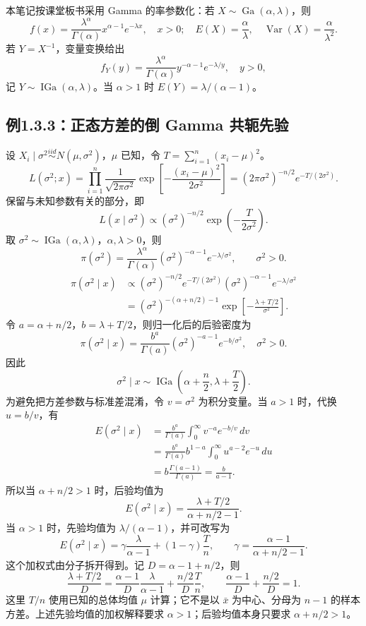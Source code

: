 本笔记按课堂板书采用 Gamma 的率参数化：若 $X\sim\operatorname{Ga}(\alpha,\lambda)$，则
\[
f(x)=\frac{\lambda^\alpha}{\Gamma(\alpha)}x^{\alpha-1}e^{-\lambda x},\quad x>0;
\quad E(X)=\frac\alpha\lambda,\quad \operatorname{Var}(X)=\frac\alpha{\lambda^2}.
\]
若 $Y=X^{-1}$，变量变换给出
\[
f_Y(y)=\frac{\lambda^\alpha}{\Gamma(\alpha)}y^{-\alpha-1}e^{-\lambda/y},\quad y>0,
\]
记 $Y\sim\operatorname{IGa}(\alpha,\lambda)$。当 $\alpha>1$ 时 $E(Y)=\lambda/(\alpha-1)$。

\subsection{例1.3.3：正态方差的倒 Gamma 共轭先验}
设 $X_i\mid\sigma^2\overset{iid}{\sim}N(\mu,\sigma^2)$，$\mu$ 已知，令 $T=\sum_{i=1}^n(x_i-\mu)^2$。
\[
L(\sigma^2;x)=\prod_{i=1}^n\frac1{\sqrt{2\pi\sigma^2}}
\exp\left[-\frac{(x_i-\mu)^2}{2\sigma^2}\right]
=(2\pi\sigma^2)^{-n/2}e^{-T/(2\sigma^2)}.
\]
保留与未知参数有关的部分，即
\[
L(x\mid\sigma^2)\propto(\sigma^2)^{-n/2}\exp\left(-\frac{T}{2\sigma^2}\right).
\]
取 $\sigma^2\sim\operatorname{IGa}(\alpha,\lambda)$，$\alpha,\lambda>0$，则
\[
\pi(\sigma^2)=\frac{\lambda^\alpha}{\Gamma(\alpha)}
(\sigma^2)^{-\alpha-1}e^{-\lambda/\sigma^2},\qquad\sigma^2>0.
\]
\begin{align*}
\pi(\sigma^2\mid x)&\propto
(\sigma^2)^{-n/2}e^{-T/(2\sigma^2)}
(\sigma^2)^{-\alpha-1}e^{-\lambda/\sigma^2}\\
&=(\sigma^2)^{-(\alpha+n/2)-1}
\exp\left[-\frac{\lambda+T/2}{\sigma^2}\right].
\end{align*}
令 $a=\alpha+n/2$，$b=\lambda+T/2$，则归一化后的后验密度为
\[
\pi(\sigma^2\mid x)=\frac{b^a}{\Gamma(a)}
(\sigma^2)^{-a-1}e^{-b/\sigma^2},\quad\sigma^2>0.
\]
因此
\[
\sigma^2\mid x\sim\operatorname{IGa}\left(\alpha+\frac n2,\lambda+\frac T2\right).
\]
为避免把方差参数与标准差混淆，令 $v=\sigma^2$ 为积分变量。当 $a>1$ 时，代换 $u=b/v$，有
\begin{align*}
E(\sigma^2\mid x)
&=\frac{b^a}{\Gamma(a)}\int_0^\infty v^{-a}e^{-b/v}\,dv\\
&=\frac{b^a}{\Gamma(a)}b^{1-a}\int_0^\infty u^{a-2}e^{-u}\,du\\
&=b\frac{\Gamma(a-1)}{\Gamma(a)}=\frac b{a-1}.
\end{align*}
所以当 $\alpha+n/2>1$ 时，后验均值为
\[
E(\sigma^2\mid x)=\frac{\lambda+T/2}{\alpha+n/2-1}.
\]
当 $\alpha>1$ 时，先验均值为 $\lambda/(\alpha-1)$，并可改写为
\[
E(\sigma^2\mid x)=\gamma\frac{\lambda}{\alpha-1}+(1-\gamma)\frac Tn,
\qquad \gamma=\frac{\alpha-1}{\alpha+n/2-1}.
\]
这个加权式由分子拆开得到。记 $D=\alpha-1+n/2$，则
\[
\frac{\lambda+T/2}{D}
=\frac{\alpha-1}{D}\frac{\lambda}{\alpha-1}
+\frac{n/2}{D}\frac Tn,
\qquad\frac{\alpha-1}{D}+\frac{n/2}{D}=1.
\]
这里 $T/n$ 使用已知的总体均值 $\mu$ 计算；它不是以 $\bar x$ 为中心、分母为 $n-1$ 的样本方差。上述先验均值的加权解释要求 $\alpha>1$；后验均值本身只要求 $\alpha+n/2>1$。

